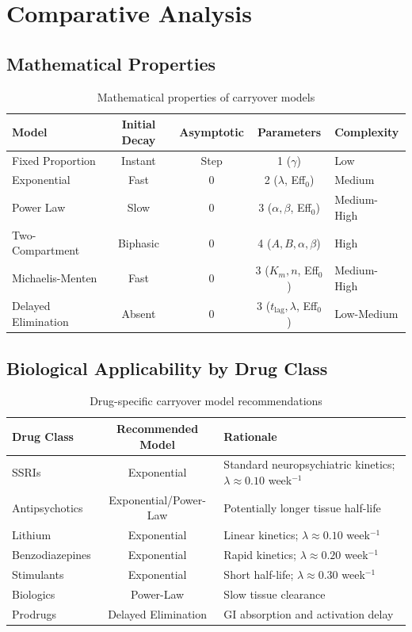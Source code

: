 \documentclass[11pt,a4paper]{article}
\begin{document}
\section{Comparative Analysis}
\label{sec:comparison}

\subsection{Mathematical Properties}

\begin{table}[h]
\centering
\begin{tabular}{lcccl}
  \toprule
  \textbf{Model} & \textbf{Initial Decay} & \textbf{Asymptotic} & \textbf{Parameters} & \textbf{Complexity} \\
  \midrule
  Fixed Proportion & Instant & Step & 1 ($\gamma$) & Low \\
  Exponential & Fast & 0 & 2 ($\lambda$, Eff$_0$) & Medium \\
  Power Law & Slow & 0 & 3 ($\alpha, \beta$, Eff$_0$) & Medium-High \\
  Two-Compartment & Biphasic & 0 & 4 ($A, B, \alpha, \beta$) & High \\
  Michaelis-Menten & Fast & 0 & 3 ($K_m, n$, Eff$_0$) & Medium-High \\
  Delayed Elimination & Absent & 0 & 3 ($t_{\text{lag}}, \lambda$, Eff$_0$) & Low-Medium \\
  \bottomrule
\end{tabular}
\caption{Mathematical properties of carryover models}
\label{tab:math_props}
\end{table}

\subsection{Biological Applicability by Drug Class}

\begin{table}[h]
\centering
\begin{tabular}{lcl}
  \toprule
  \textbf{Drug Class} & \textbf{Recommended Model} & \textbf{Rationale} \\
  \midrule
  SSRIs & Exponential & Standard neuropsychiatric kinetics; $\lambda \approx 0.10$ week$^{-1}$ \\
  Antipsychotics & Exponential/Power-Law & Potentially longer tissue half-life \\
  Lithium & Exponential & Linear kinetics; $\lambda \approx 0.10$ week$^{-1}$ \\
  Benzodiazepines & Exponential & Rapid kinetics; $\lambda \approx 0.20$ week$^{-1}$ \\
  Stimulants & Exponential & Short half-life; $\lambda \approx 0.30$ week$^{-1}$ \\
  Biologics & Power-Law & Slow tissue clearance \\
  Prodrugs & Delayed Elimination & GI absorption and activation delay \\
  \bottomrule
\end{tabular}
\caption{Drug-specific carryover model recommendations}
\label{tab:drug_specific}
\end{table}
\end{document}
